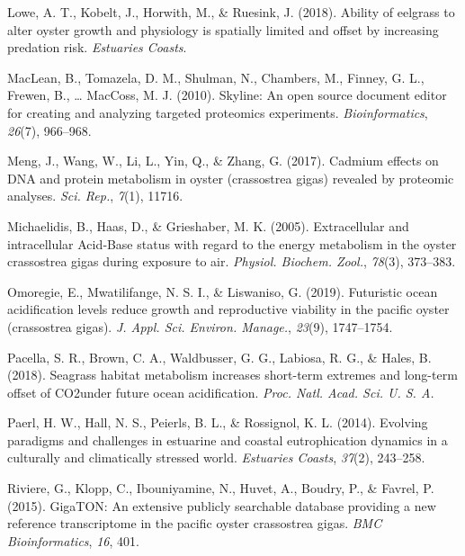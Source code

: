 \documentclass [11pt, proquest] {uwthesis}[2015/03/03]
\newlength{\cslhangindent}
\newenvironment{CSLReferences}%
{\setlength{\parindent}{0pt}%
\everypar{\setlength{\hangindent}{\cslhangindent}}\ignorespaces}%
{\par}
\begin{document}
\begin{CSLReferences}{1}{0}
\leavevmode\hypertarget{ref-Lowe2018}{}%
Lowe, A. T., Kobelt, J., Horwith, M., \& Ruesink, J. (2018). Ability of eelgrass to alter oyster growth and physiology is spatially limited and offset by increasing predation risk. \emph{Estuaries Coasts}.

\leavevmode\hypertarget{ref-MacLean2010}{}%
MacLean, B., Tomazela, D. M., Shulman, N., Chambers, M., Finney, G. L., Frewen, B., \ldots{} MacCoss, M. J. (2010). Skyline: An open source document editor for creating and analyzing targeted proteomics experiments. \emph{Bioinformatics}, \emph{26}(7), 966--968.

\leavevmode\hypertarget{ref-Meng2017}{}%
Meng, J., Wang, W., Li, L., Yin, Q., \& Zhang, G. (2017). Cadmium effects on {DNA} and protein metabolism in oyster (crassostrea gigas) revealed by proteomic analyses. \emph{Sci. Rep.}, \emph{7}(1), 11716.

\leavevmode\hypertarget{ref-Michaelidis2005}{}%
Michaelidis, B., Haas, D., \& Grieshaber, M. K. (2005). Extracellular and intracellular {Acid‐Base} status with regard to the energy metabolism in the oyster crassostrea gigas during exposure to air. \emph{Physiol. Biochem. Zool.}, \emph{78}(3), 373--383.

\leavevmode\hypertarget{ref-Omoregie2019}{}%
Omoregie, E., Mwatilifange, N. S. I., \& Liswaniso, G. (2019). Futuristic ocean acidification levels reduce growth and reproductive viability in the pacific oyster (crassostrea gigas). \emph{J. Appl. Sci. Environ. Manage.}, \emph{23}(9), 1747--1754.

\leavevmode\hypertarget{ref-Pacella2018}{}%
Pacella, S. R., Brown, C. A., Waldbusser, G. G., Labiosa, R. G., \& Hales, B. (2018). Seagrass habitat metabolism increases short-term extremes and long-term offset of {CO2under} future ocean acidification. \emph{Proc. Natl. Acad. Sci. U. S. A.}

\leavevmode\hypertarget{ref-Paerl2014}{}%
Paerl, H. W., Hall, N. S., Peierls, B. L., \& Rossignol, K. L. (2014). Evolving paradigms and challenges in estuarine and coastal eutrophication dynamics in a culturally and climatically stressed world. \emph{Estuaries Coasts}, \emph{37}(2), 243--258.

\leavevmode\hypertarget{ref-Riviere2015}{}%
Riviere, G., Klopp, C., Ibouniyamine, N., Huvet, A., Boudry, P., \& Favrel, P. (2015). {GigaTON}: An extensive publicly searchable database providing a new reference transcriptome in the pacific oyster crassostrea gigas. \emph{BMC Bioinformatics}, \emph{16}, 401.


\end{CSLReferences}
\end{document}
